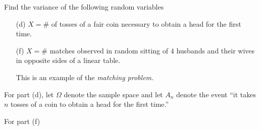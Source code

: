 \begin{problem}[Handout 7, \# 6(d, f)]
  Find the variance of the following random variables
  \begin{itemize}[noitemsep]
  \item[(d)] \(X=\#\) of tosses of a fair coin necessary to obtain a head
    for the first time.
  \item[(f)] \(X=\#\) matches observed in random sitting of \(4\) husbands
    and their wives in opposite sides of a linear table.

    This is an example of the \emph{matching problem.}
  \end{itemize}
\end{problem}
\begin{solution}
  For part (d), let \(\Omega\) denote the sample space and let \(A_n\)
  denote the event ``it takes \(n\) tosses of a coin to obtain a head for
  the first time.''

  For part (f)
\end{solution}
\newpage




